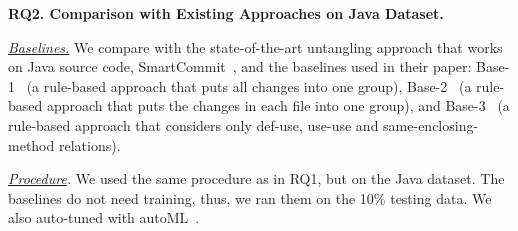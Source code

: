 

\noindent\textbf{RQ2. Comparison with Existing Approaches on Java Dataset.}

{\em \underline{Baselines.}} We compare {\tool} with the
state-of-the-art untangling approach that works on Java source code,
SmartCommit~\cite{smartcommit-fse21}, and the baselines used in their
paper: Base-1~\cite{smartcommit-fse21} (a rule-based approach that
puts all changes into one group), Base-2~\cite{smartcommit-fse21} (a
rule-based approach that puts the changes in each file into one
group), and Base-3~\cite{smartcommit-fse21} (a rule-based approach
that considers only def-use, use-use and same-enclosing-method
relations).




\textit{ \underline{Procedure}.}
We used the same procedure as in RQ1, but on the Java dataset.  The
baselines do not need training, thus, we ran them on the 10\% testing
data. We also auto-tuned {\tool} with autoML~\cite{NNI}.

